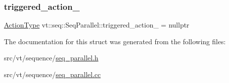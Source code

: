 \subsubsection{\texorpdfstring{triggered\+\_\+action\+\_\+}{triggered\_action\_}}
{\footnotesize\ttfamily \hyperlink{namespacevt_ae0a5a7b18cc99d7b732cb4d44f46b0f3}{Action\+Type} vt\+::seq\+::\+Seq\+Parallel\+::triggered\+\_\+action\+\_\+ = nullptr\hspace{0.3cm}{\ttfamily [private]}}



The documentation for this struct was generated from the following files\+:\begin{DoxyCompactItemize}
\item 
src/vt/sequence/\hyperlink{seq__parallel_8h}{seq\+\_\+parallel.\+h}\item 
src/vt/sequence/\hyperlink{seq__parallel_8cc}{seq\+\_\+parallel.\+cc}\end{DoxyCompactItemize}
